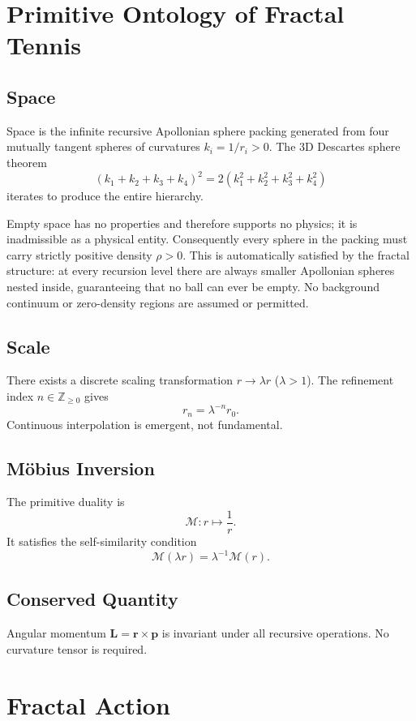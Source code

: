 \documentclass[11pt,a4paper]{article}
\begin{document}
\section{Primitive Ontology of Fractal Tennis}
\subsection{Space}
Space is the infinite recursive Apollonian sphere packing generated from four mutually tangent spheres of curvatures $k_i=1/r_i>0$. The 3D Descartes sphere theorem
\[
(k_1+k_2+k_3+k_4)^2=2(k_1^2+k_2^2+k_3^2+k_4^2)
\]
iterates to produce the entire hierarchy.

Empty space has no properties and therefore supports no physics; it is inadmissible as a physical entity. Consequently every sphere in the packing must carry strictly positive density $\rho>0$. This is automatically satisfied by the fractal structure: at every recursion level there are always smaller Apollonian spheres nested inside, guaranteeing that no ball can ever be empty. No background continuum or zero-density regions are assumed or permitted.

\subsection{Scale}
There exists a discrete scaling transformation $r\to\lambda r$ ($\lambda>1$). The refinement index $n\in\mathbb{Z}_{\geq0}$ gives
\[
r_n=\lambda^{-n}r_0.
\]
Continuous interpolation is emergent, not fundamental.

\subsection{M\"obius Inversion}
The primitive duality is
\[
\mathcal{M}:r\mapsto\frac{1}{r}.
\]
It satisfies the self-similarity condition
\[
\mathcal{M}(\lambda r)=\lambda^{-1}\mathcal{M}(r).
\]

\subsection{Conserved Quantity}
Angular momentum $\mathbf{L}=\mathbf{r}\times\mathbf{p}$ is invariant under all recursive operations. No curvature tensor is required.

\section{Fractal Action}
\end{document}
